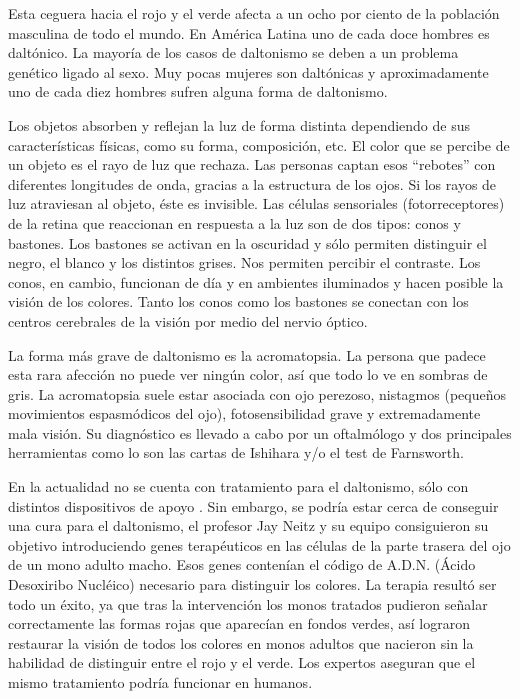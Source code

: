 \documentclass[10pt]{article}
\begin{document}
\setlength{\parskip}{2mm}

Esta ceguera hacia el rojo y el verde afecta a un ocho por ciento de la población masculina de todo el mundo. En América Latina uno de cada doce hombres es daltónico. La mayoría de los casos de daltonismo se deben a un problema genético ligado al sexo. Muy pocas mujeres son daltónicas y aproximadamente uno de cada diez hombres sufren alguna forma de daltonismo.

\setlength{\parskip}{2mm}

Los objetos absorben y reflejan la luz de forma distinta dependiendo de sus características físicas, como su forma, composición, etc. El color que se percibe de un objeto es el rayo de luz que rechaza. Las personas captan esos “rebotes” con diferentes longitudes de onda, gracias a la estructura de los ojos. Si los rayos de luz atraviesan al objeto, éste es invisible. Las células sensoriales (fotorreceptores) de la retina que reaccionan en respuesta a la luz son de dos tipos: conos y bastones. Los bastones se activan en la oscuridad y sólo permiten distinguir el negro, el blanco y los distintos grises. Nos permiten percibir el contraste. Los conos, en cambio, funcionan de día y en ambientes iluminados y hacen posible la visión de los colores. Tanto los conos como los bastones se conectan con los centros cerebrales de la visión por medio del nervio óptico.

\setlength{\parskip}{2mm}

La forma más grave de daltonismo es la acromatopsia. La persona que padece esta rara afección no puede ver ningún color, así que todo lo ve en sombras de gris. La acromatopsia suele estar asociada con ojo perezoso, nistagmos (pequeños movimientos espasmódicos del ojo), fotosensibilidad grave y extremadamente mala visión. Su diagnóstico es llevado a cabo por un oftalmólogo y dos principales herramientas como lo son las cartas de Ishihara y/o el test de Farnsworth\cite{IEEEreferencias:Ref3}.

\setlength{\parskip}{2mm}

En la actualidad no se cuenta con tratamiento para el daltonismo, sólo con distintos dispositivos de apoyo \cite{IEEEreferencias:Ref1}. Sin embargo, se podría estar cerca de conseguir una cura para el daltonismo, el profesor Jay Neitz y su equipo consiguieron su objetivo introduciendo genes terapéuticos en las células de la parte trasera del ojo de un mono adulto macho. Esos genes contenían el código de A.D.N. (Ácido Desoxiribo Nucléico) necesario para distinguir los colores. La terapia resultó ser todo un éxito, ya que tras la intervención los monos tratados pudieron señalar correctamente las formas rojas que aparecían en fondos verdes, así lograron restaurar la visión de todos los colores en monos adultos que nacieron sin la habilidad de distinguir entre el rojo y el verde. Los expertos aseguran que el mismo tratamiento podría funcionar en humanos\cite{IEEEreferencias:Ref4}.
\newpage
\end{document}
